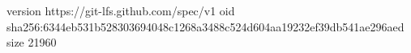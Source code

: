 version https://git-lfs.github.com/spec/v1
oid sha256:6344eb531b528303694048c1268a3488c524d604aa19232ef39db541ae296aed
size 21960
